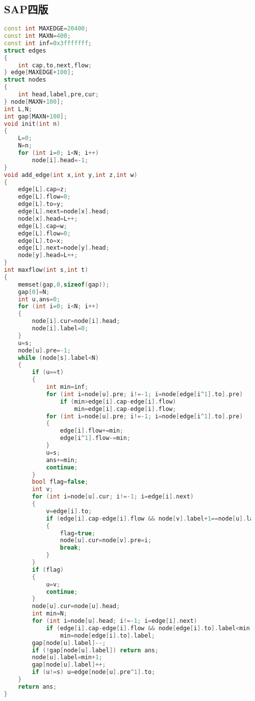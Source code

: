 \subsection{SAP四版}
    \begin{lstlisting}[language=c++]
const int MAXEDGE=20400;
const int MAXN=400;
const int inf=0x3fffffff;
struct edges
{
    int cap,to,next,flow;
} edge[MAXEDGE+100];
struct nodes
{
    int head,label,pre,cur;
} node[MAXN+100];
int L,N;
int gap[MAXN+100];
void init(int n)
{
    L=0;
    N=n;
    for (int i=0; i<N; i++)
        node[i].head=-1;
}
void add_edge(int x,int y,int z,int w)
{
    edge[L].cap=z;
    edge[L].flow=0;
    edge[L].to=y;
    edge[L].next=node[x].head;
    node[x].head=L++;
    edge[L].cap=w;
    edge[L].flow=0;
    edge[L].to=x;
    edge[L].next=node[y].head;
    node[y].head=L++;
}
int maxflow(int s,int t)
{
    memset(gap,0,sizeof(gap));
    gap[0]=N;
    int u,ans=0;
    for (int i=0; i<N; i++)
    {
        node[i].cur=node[i].head;
        node[i].label=0;
    }
    u=s;
    node[u].pre=-1;
    while (node[s].label<N)
    {
        if (u==t)
        {
            int min=inf;
            for (int i=node[u].pre; i!=-1; i=node[edge[i^1].to].pre)
                if (min>edge[i].cap-edge[i].flow)
                    min=edge[i].cap-edge[i].flow;
            for (int i=node[u].pre; i!=-1; i=node[edge[i^1].to].pre)
            {
                edge[i].flow+=min;
                edge[i^1].flow-=min;
            }
            u=s;
            ans+=min;
            continue;
        }
        bool flag=false;
        int v;
        for (int i=node[u].cur; i!=-1; i=edge[i].next)
        {
            v=edge[i].to;
            if (edge[i].cap-edge[i].flow && node[v].label+1==node[u].label)
            {
                flag=true;
                node[u].cur=node[v].pre=i;
                break;
            }
        }
        if (flag)
        {
            u=v;
            continue;
        }
        node[u].cur=node[u].head;
        int min=N;
        for (int i=node[u].head; i!=-1; i=edge[i].next)
            if (edge[i].cap-edge[i].flow && node[edge[i].to].label<min)
                min=node[edge[i].to].label;
        gap[node[u].label]--;
        if (!gap[node[u].label]) return ans;
        node[u].label=min+1;
        gap[node[u].label]++;
        if (u!=s) u=edge[node[u].pre^1].to;
    }
    return ans;
}
    \end{lstlisting}